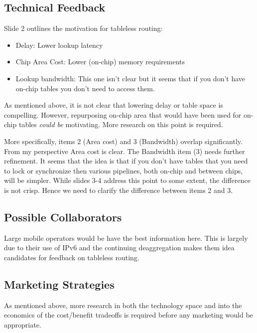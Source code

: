 \documentclass[11pt, oneside]{article}   	%
\begin{document}


\subsection{Technical Feedback}
\label{slide2:technical_feedback}
Slide 2 outlines the motivation for tableless routing: 

\bigskip
\noindent

\begin{itemize}
\item Delay: Lower lookup latency
\item Chip Area Cost:  Lower (on-chip) memory requirements
\item Lookup bandwidth: This one isn't clear but it seems that if you don't have on-chip tables you don't need to access them.
\end{itemize}

\bigskip
\noindent
As mentioned above, it is not clear that lowering delay or table space is compelling. However, repurposing on-chip area that would have been used for on-chip
tables \emph{could be} motivating. More research on this point is required.

\bigskip
\noindent
More specifically, items 2 (Area cost) and 3 (Bandwidth) overlap significantly.  From my perspective Area cost is clear. The Bandwidth item (3) needs further
refinement.  It seems that the idea is that if you don't have tables that you need to lock or synchronize then various pipelines, both on-chip and
between chips, will be simpler. While slides 3-4  address this point to some extent, the difference is not crisp.  Hence we need to clarify the difference between items 2 and 3. 


\subsection{Possible Collaborators}
\label{slide2:possible_collaborators}
Large mobile operators would be have the best information here. This is largely due to their use of IPv6 and the continuing deaggregation 
makes them idea candidates for feedback on tableless routing.

\subsection{Marketing Strategies}
\label{slide2:marketing_strategies}
As mentioned above, more research in both the technology space and into the economics of the cost/benefit tradeoffs is required before any
marketing would be appropriate.
\end{document}
